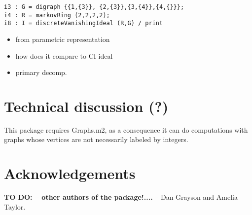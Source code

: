 \documentclass{article}
\theoremstyle{definition}
\begin{document}
\begin{verbatim}
i3 : G = digraph {{1,{3}}, {2,{3}},{3,{4}},{4,{}}};
i4 : R = markovRing (2,2,2,2);
i8 : I = discreteVanishingIdeal (R,G) / print

\end{verbatim}


\begin{itemize}
\item from parametric representation
\item how does it compare to CI ideal
\item primary decomp.
\end{itemize}




\section{Technical discussion (?) }
This package requires Graphs.m2, as a consequence it can do
computations with graphs whose vertices are not necessarily labeled by
integers. 


\section*{Acknowledgements} {\bf TO DO: -- other authors of the package!....} -- Dan Grayson and Amelia Taylor.
\end{document}
